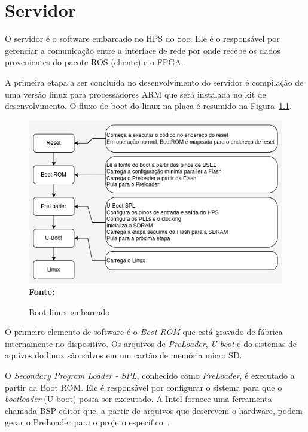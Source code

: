 \chapter{Servidor}

O servidor é o software embarcado no HPS do Soc. Ele é o responsável por gerenciar a comunicação entre a interface de rede por onde recebe os dados provenientes do pacote ROS (cliente) e o FPGA\@.

A primeira etapa a ser concluída no desenvolvimento do servidor é compilação de uma versão linux para processadores ARM que será instalada no kit de desenvolvimento. O fluxo de boot do linux na placa é resumido na Figura~\ref{fig:linux}. 

\begin{figure}[ht]
	\caption{Boot linux embarcado}
	\begin{center}
		\includegraphics[scale=0.5]{imagens/embeddedLinux.png}\\
		{\small \textbf{Fonte:}\cite{SocLinux}}
    \end{center}\label{fig:linux}
\end{figure}

O primeiro elemento de software é o \textit{Boot ROM} que está gravado de fábrica internamente no dispositivo. Os arquivos de \textit{PreLoader},\textit{ U-boot} e do sistemas de aquivos do linux são salvos em um cartão de memória micro SD\@.

O \textit{Secondary Program Loader - SPL}, conhecido como \textit{PreLoader}, é executado a partir da Boot ROM\@. Ele é responsável por configurar o sistema para que o \textit{bootloader} (U-boot) possa ser executado. A Intel fornece uma ferramenta chamada BSP editor que, a partir de arquivos que descrevem o hardware, podem gerar o PreLoader para o projeto específico~\cite{SocLinux}.  

